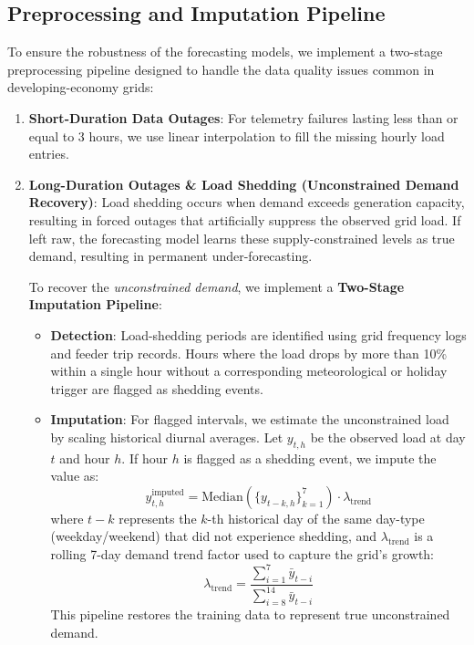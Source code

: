 \documentclass[journal]{IEEEtran}
\begin{document}
\subsection{Preprocessing and Imputation Pipeline}
To ensure the robustness of the forecasting models, we implement a two-stage preprocessing pipeline designed to handle the data quality issues common in developing-economy grids:
\begin{enumerate}
    \item \textbf{Short-Duration Data Outages}: For telemetry failures lasting less than or equal to 3 hours, we use linear interpolation to fill the missing hourly load entries.
    \item \textbf{Long-Duration Outages \& Load Shedding (Unconstrained Demand Recovery)}: 
    Load shedding occurs when demand exceeds generation capacity, resulting in forced outages that artificially suppress the observed grid load. If left raw, the forecasting model learns these supply-constrained levels as true demand, resulting in permanent under-forecasting.
    
    To recover the \textit{unconstrained demand}, we implement a \textbf{Two-Stage Imputation Pipeline}:
    \begin{itemize}
        \item \textbf{Detection}: Load-shedding periods are identified using grid frequency logs and feeder trip records. Hours where the load drops by more than 10\% within a single hour without a corresponding meteorological or holiday trigger are flagged as shedding events.
        \item \textbf{Imputation}: For flagged intervals, we estimate the unconstrained load by scaling historical diurnal averages. Let $y_{t,h}$ be the observed load at day $t$ and hour $h$. If hour $h$ is flagged as a shedding event, we impute the value as:
        \begin{equation}
        y^{\text{imputed}}_{t,h} = \text{Median}\left( \{ y_{t-k, h} \}_{k=1}^7 \right) \cdot \lambda_{\text{trend}}
        \end{equation}
        where $t-k$ represents the $k$-th historical day of the same day-type (weekday/weekend) that did not experience shedding, and $\lambda_{\text{trend}}$ is a rolling 7-day demand trend factor used to capture the grid's growth:
        \begin{equation}
        \lambda_{\text{trend}} = \frac{\sum_{i=1}^7 \bar{y}_{t-i}}{\sum_{i=8}^{14} \bar{y}_{t-i}}
        \end{equation}
        This pipeline restores the training data to represent true unconstrained demand.
    \end{itemize}
\end{enumerate}
\end{document}
